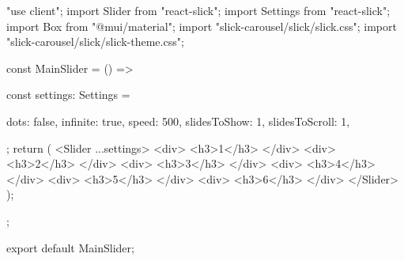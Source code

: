 "use client";
import Slider from "react-slick";
import { Settings } from "react-slick";
import { Box } from "@mui/material";
import "slick-carousel/slick/slick.css";
import "slick-carousel/slick/slick-theme.css";

const MainSlider = () => {
  const settings: Settings = {
    dots: false,
    infinite: true,
    speed: 500,
    slidesToShow: 1,
    slidesToScroll: 1,
    
    

  };
  return (
    <Slider {...settings}>
      <div>
        <h3>1</h3>
      </div>
      <div>
        <h3>2</h3>
      </div>
      <div>
        <h3>3</h3>
      </div>
      <div>
        <h3>4</h3>
      </div>
      <div>
        <h3>5</h3>
      </div>
      <div>
        <h3>6</h3>
      </div>
    </Slider>
  );
};

export default MainSlider;
